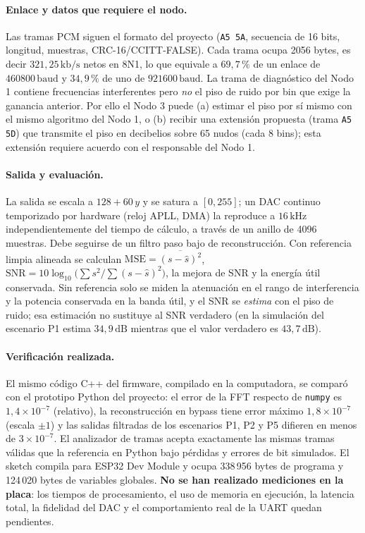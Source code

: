 \paragraph{Enlace y datos que requiere el nodo.}
Las tramas PCM siguen el formato del proyecto (\texttt{A5 5A}, secuencia de 16 bits, longitud, muestras, CRC-16/CCITT-FALSE).
Cada trama ocupa 2056 bytes, es decir $321{,}25\,\mathrm{kb/s}$ netos en 8N1, lo que equivale a $69{,}7\,\%$ de un enlace de
$460800\,\mathrm{baud}$ y $34{,}9\,\%$ de uno de $921600\,\mathrm{baud}$. La trama de diagn\'ostico del Nodo 1 contiene frecuencias
interferentes pero \emph{no} el piso de ruido por bin que exige la ganancia anterior. Por ello el Nodo 3 puede (a) estimar el piso
por s\'i mismo con el mismo algoritmo del Nodo 1, o (b) recibir una extensi\'on propuesta (trama \texttt{A5 5D}) que transmite el piso en decibelios
sobre 65 nudos (cada 8 bins); esta extensi\'on requiere acuerdo con el responsable del Nodo 1.

\paragraph{Salida y evaluaci\'on.}
La salida se escala a $128+60\,y$ y se satura a $[0,255]$; un DAC continuo temporizado por hardware (reloj APLL, DMA) la
reproduce a $16\,\mathrm{kHz}$ independientemente del tiempo de c\'alculo, a trav\'es de un anillo de 4096 muestras. Debe seguirse de un
filtro paso bajo de reconstrucci\'on. Con referencia limpia alineada se calculan
$\mathrm{MSE}=\overline{(s-\hat{s})^2}$, $\mathrm{SNR}=10\log_{10}\!\big(\sum s^2/\sum(s-\hat{s})^2\big)$, la mejora de SNR y la
energ\'ia \'util conservada. Sin referencia solo se miden la atenuaci\'on en el rango de interferencia y la potencia conservada en la
banda \'util, y el SNR se \emph{estima} con el piso de ruido; esa estimaci\'on no sustituye al SNR verdadero (en la simulaci\'on del
escenario P1 estima $34{,}9\,\mathrm{dB}$ mientras que el valor verdadero es $43{,}7\,\mathrm{dB}$).

\paragraph{Verificaci\'on realizada.}
El mismo c\'odigo C++ del firmware, compilado en la computadora, se compar\'o con el prototipo Python del proyecto: el error de la
FFT respecto de \texttt{numpy} es $1{,}4\times10^{-7}$ (relativo), la reconstrucci\'on en bypass tiene error m\'aximo
$1{,}8\times10^{-7}$ (escala $\pm1$) y las salidas filtradas de los escenarios P1, P2 y P5 difieren en menos de $3\times10^{-7}$.
El analizador de tramas acepta exactamente las mismas tramas v\'alidas que la referencia en Python bajo p\'erdidas y errores de bit
simulados. El sketch compila para ESP32 Dev Module y ocupa 338\,956 bytes de programa y 124\,020 bytes de variables globales.
\textbf{No se han realizado mediciones en la placa}: los tiempos de procesamiento, el uso de memoria en ejecuci\'on, la latencia
total, la fidelidad del DAC y el comportamiento real de la UART quedan pendientes.

